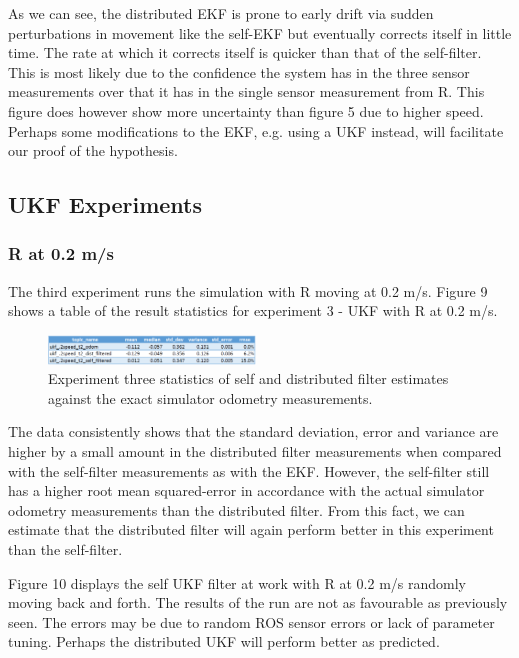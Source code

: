 \documentclass[conference]{IEEEtran} \usepackage[T1]{fontenc} \usepackage[backend=biber, style=ieee]{biblatex}
\begin{document}
As we can see, the distributed EKF is prone to early drift via sudden perturbations in movement like the self-EKF but 
eventually corrects itself in little time. The rate at which it corrects itself is quicker than that of the self-filter. 
This is most likely due to the confidence the system has in the three sensor measurements over that it has in the single 
sensor measurement from R. This figure does however show more uncertainty than figure 5 due to higher speed. Perhaps some 
modifications to the EKF, e.g. using a UKF instead, will facilitate our proof of the hypothesis.

\subsection{UKF Experiments} \label{UKF Experiments}
\subsubsection{R at 0.2 m/s} \label{UKF .2}
The third experiment runs the simulation with R moving at 0.2 m/s. Figure 9 shows a table of the result statistics for experiment 3 - UKF 
with R at 0.2 m/s. 

\begin{figure}[!ht]
\label{pic9} 
\centering 
\includegraphics[width=0.49\textwidth]{ukf_2_table}
\caption{Experiment three statistics of self and distributed filter estimates against the exact simulator odometry measurements.} 
\end{figure}

The data consistently shows that the standard deviation, error and variance are higher by a small amount in 
the distributed filter measurements when compared with the self-filter measurements as with the EKF. However, 
the self-filter still has a higher root mean squared-error in accordance with the actual simulator odometry 
measurements than the distributed filter. From this fact, we can estimate that the distributed filter will 
again perform better in this experiment than the self-filter.

Figure 10 displays the self UKF filter at work with R at 0.2 m/s randomly moving back 
and forth. The results of the run are not as favourable as previously seen. The 
errors may be due to random ROS sensor errors or lack of parameter tuning. Perhaps 
the distributed UKF will perform better as predicted.
\end{document}
